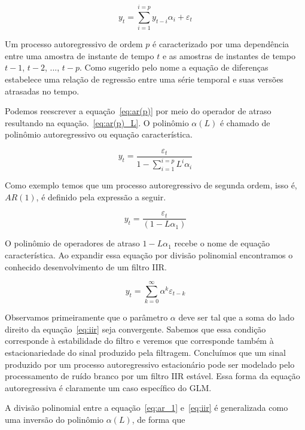 \begin{equation}\label{eq:ar(p)}
   y_t = \sum^{i=p}_{i=1} y_{t-i} \alpha_i + \varepsilon_t
\end{equation}

Um processo autoregressivo de ordem $p$ é caracterizado por uma dependência
entre uma amostra de instante de tempo $t$ e as amostras de instantes de tempo
$t-1$, $t-2$, ..., $t-p$. Como sugerido pelo nome a equação de diferenças
estabelece uma relação de regressão entre uma série temporal e suas versões
atrasadas no tempo.

Podemos reescrever a equação~\ref{eq:ar(p)} por meio do operador de atraso
resultando na equação.~\ref{eq:ar(p)_L}. O polinômio $\alpha(L)$ é chamado de
polinômio autoregressivo ou equação característica.

\begin{equation}\label{eq:ar(p)_L}
    y_t = \frac{\varepsilon_t}{1 - \sum_{i=1}^{i=p} L^i \alpha_i}
\end{equation}

Como exemplo temos que um processo autoregressivo de segunda ordem, isso é,
$AR(1)$, é definido pela expressão a seguir.

\begin{equation}\label{eq:ar_1}
    y_t = \frac{\varepsilon_t}{(1 - L\alpha_1)}
\end{equation}

O polinômio de operadores de atraso $1 - L\alpha_1$ recebe o nome de equação
característica. Ao expandir essa equação por divisão polinomial encontramos o
conhecido desenvolvimento de um filtro IIR.

\begin{equation}\label{eq:iir}
    y_t = \sum^{\infty}_{k=0} \alpha^k \varepsilon_{t-k}
\end{equation}

Observamos primeiramente que o parâmetro $\alpha$ deve ser tal que a soma do
lado direito da equação~\ref{eq:iir} seja convergente. Sabemos que essa
condição corresponde à estabilidade do filtro e veremos que corresponde também
à estacionariedade do sinal produzido pela filtragem. Concluímos que um sinal
produzido por um processo autoregressivo estacionário pode ser modelado pelo
processamento de ruído branco por um filtro IIR estável. Essa forma da
equação autoregressiva é claramente um caso específico do GLM.

A divisão polinomial entre a equação~\ref{eq:ar_1} e~\ref{eq:iir} é generalizada
como uma inversão do polinômio $\alpha(L)$, de forma que

